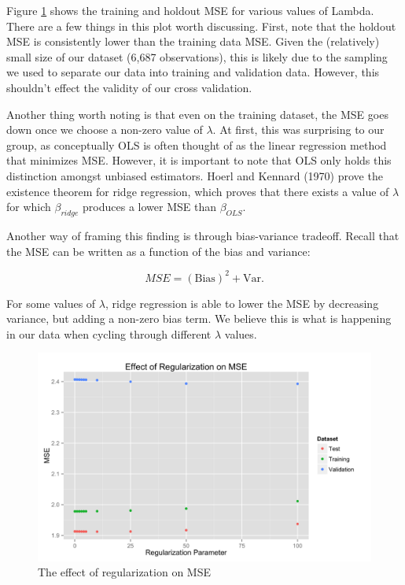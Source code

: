 \documentclass[fleqn,12pt]{SelfArx} %
\begin{document}
Figure \ref{fig:mse_plot} shows the training and holdout MSE for various values of Lambda. There are a few things in this plot worth discussing. First, note that the holdout MSE is consistently lower than the training data MSE. Given the (relatively) small size of our dataset (6,687 observations), this is likely due to the sampling we used to separate our data into training and validation data. However, this shouldn't effect the validity of our cross validation.

Another thing worth noting is that even on the training dataset, the MSE goes down once we choose a non-zero value of $\lambda$. At first, this was surprising to our group, as conceptually OLS is often thought of as the linear regression method that minimizes MSE. However, it is important to note that OLS only holds this distinction amongst unbiased estimators. Hoerl and Kennard (1970) \cite{hoerl1970ridge} prove the existence theorem for ridge regression, which proves that there exists a value of $\lambda$ for which $\beta_{ridge}$ produces a lower MSE than $\beta_{OLS}$. 

Another way of framing this finding is through bias-variance tradeoff. Recall that the MSE can be written as a function of the bias and variance:

\begin{equation}
MSE = (\textrm{Bias})^2 + \textrm{Var}.
\end{equation}

\noindent For some values of $\lambda$, ridge regression is able to lower the MSE by decreasing variance, but adding a non-zero bias term. We believe this is what is happening in our data when cycling through different $\lambda$ values.

\begin{figure}[ht]\centering
\includegraphics[width=\linewidth]{mse_plot.png}
\caption{The effect of regularization on MSE}
\label{fig:mse_plot}
\end{figure}
\end{document}
